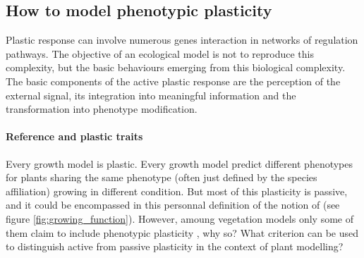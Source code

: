 \subsection{How to model phenotypic plasticity}

Plastic response can involve numerous genes interaction in networks of regulation pathways. The objective of an ecological model is not to reproduce this complexity, but the basic behaviours emerging from this biological complexity. The basic components of the active plastic response are the perception of the external signal, its integration into meaningful information and the transformation into phenotype modification.

\paragraph{Reference and plastic traits}

Every growth model is plastic. Every growth model predict different phenotypes for plants sharing the  same phenotype (often just defined by the species affiliation) growing in different condition. But most of this plasticity is passive, and it could be encompassed in this personnal definition of the notion of  (see figure \ref{fig:growing_function}). However, amoung vegetation models only some of them claim to include phenotypic plasticity \parencite{maire_plasticity_2013}, why so? What criterion can be used to distinguish active from passive plasticity in the context of plant modelling?

